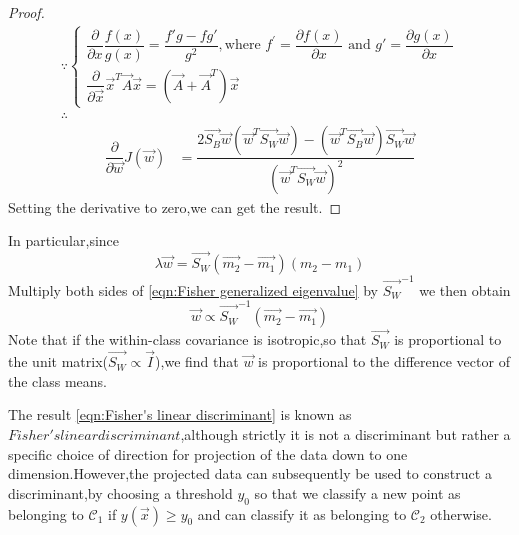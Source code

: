 \begin{proof}
\begin{eqnarray}\because\begin{cases}
	\dfrac{\partial}{\partial x}\dfrac{f(x)}{g(x)} = \dfrac{f'g-fg'}{g^2}, \text{where } f^\prime = \dfrac{\partial f(x)}{\partial x} \text{ and } g' = \dfrac{\partial g(x)}{\partial x}
	\\ \dfrac{\partial}{\partial \vec{x}} \vec{x}^T\vec{A}\vec{x} = (\vec{A}+\vec{A}^T)\vec{x}
\end{cases}	\\
\therefore\end{eqnarray}
\begin{eqnarray}
\dfrac{\partial}{\partial \vec{w}}J(\vec{w}) & =  \dfrac{2\vec{S_B}\vec{w}(\vec{w}^T\vec{S_W}\vec{w})-(\vec{w}^T\vec{S_B}\vec{w})\vec{S_W}\vec{w}}{(\vec{w}^T\vec{S_W}\vec{w})^2}
\end{eqnarray}
Setting the derivative to zero,we can get the result.
\end{proof}
In particular,since 
\begin{equation}
\lambda\vec{w} = \vec{S_W}(\vec{m_2}-\vec{m_1})(m_2-m_1)
\end{equation}
Multiply both sides of \ref{eqn:Fisher generalized eigenvalue} by $\vec{S_W}^{-1}$ we then obtain
\begin{equation}\label{eqn:Fisher's linear discriminant}
\vec{w} \propto \vec{S_W}^{-1}(\vec{m_2}-\vec{m_1})
\end{equation}
Note that if the within-class covariance is isotropic,so that $\vec{S_W}$ is proportional to the unit matrix($\vec{S_W} \propto \vec{I}$),we find that $\vec{w}$ is proportional to the difference vector of the class means.

The result \ref{eqn:Fisher's linear discriminant} is known as $Fisher's linear discriminant$,although strictly it is not a discriminant but rather a specific choice of direction for projection of the data down to one dimension.However,the projected data can subsequently be used to construct a discriminant,by choosing a threshold $y_0$ so that we classify a new point as belonging to $\mathcal{C}_1$ if $y(\vec{x}) \geq y_0$ and can classify it as belonging to $\mathcal{C}_2$ otherwise.

